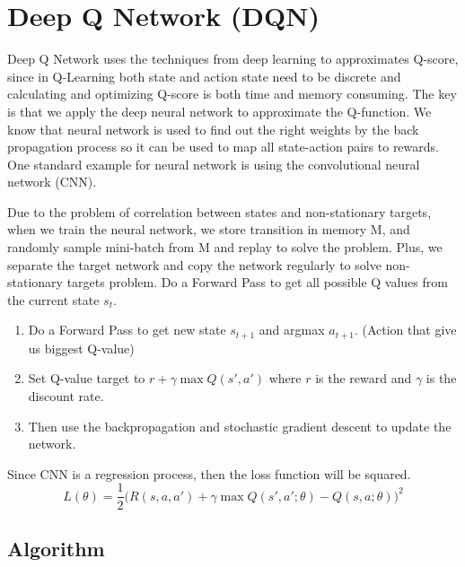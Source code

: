\section{Deep Q Network (DQN)}
Deep Q Network uses the techniques from deep learning to approximates Q-score, since in Q-Learning both state and action state need to be discrete and calculating and optimizing Q-score is both time and memory consuming. The key is that we apply the deep neural network to approximate the Q-function. We know that neural network is used to find out the right weights by the back propagation process so it can be used to map all state-action pairs to rewards. One standard example for neural network is using the convolutional neural network (CNN). 

Due to the problem of correlation between states and non-stationary targets, when we train the neural network, we store transition in memory M, and randomly sample mini-batch from M and replay to solve the problem. Plus, we separate the target network and copy the network regularly to solve non-stationary targets problem. Do a Forward Pass to get all possible Q values from the current state $s_t$.
\begin{enumerate}{}
\item Do a Forward Pass to get new state $s_{t+1}$ and argmax $a_{t+1}$. (Action that give us biggest Q-value)
\item Set Q-value target to $r+\gamma  \max Q(s',a')$ where $r$ is the reward and $\gamma$ is the discount rate.
\item Then use the backpropagation and stochastic gradient descent to update the network.
\end{enumerate}

Since CNN is a regression process, then the loss function will be squared.
$$L(\theta )=\frac{1}{2} \Big( R(s,a,a')+\gamma  \max Q(s',a';\theta)-Q(s,a;\theta) \Big)^2$$
\subsection{Algorithm}